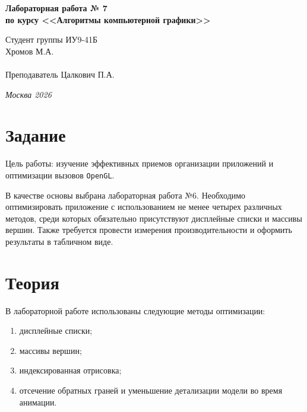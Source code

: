 \documentclass[a4paper, 14pt]{extarticle}
\begin{document}
\begin{titlepage}
\vspace{11em}

\begin{center}
\Large {\bf Лабораторная работа № 7} \\
\large {\bf по курсу <<Алгоритмы компьютерной графики>>} \\
\end{center}\normalsize

\vspace{8em}

\begin{flushright}
  {Студент группы ИУ9-41Б \\
  Хромов М.А. \\
  \\
  \vspace{2ex}
  Преподаватель Цалкович П.А.}
\end{flushright}

\bigskip
\vfill

\begin{center}
\textsl{Москва 2026}
\end{center}
\end{titlepage}

\renewcommand{\ttdefault}{pcr}
\newpage
\setcounter{page}{2}

\section{Задание}
Цель работы: изучение эффективных приемов организации приложений и оптимизации вызовов \texttt{OpenGL}.

В качестве основы выбрана лабораторная работа №6. Необходимо оптимизировать приложение с использованием не менее четырех различных методов, среди которых обязательно присутствуют дисплейные списки и массивы вершин. Также требуется провести измерения производительности и оформить результаты в табличном виде.

\section{Теория}
В лабораторной работе использованы следующие методы оптимизации:
\begin{enumerate}
  \item дисплейные списки;
  \item массивы вершин;
  \item индексированная отрисовка;
  \item отсечение обратных граней и уменьшение детализации модели во время анимации.
\end{enumerate}
\end{document}
